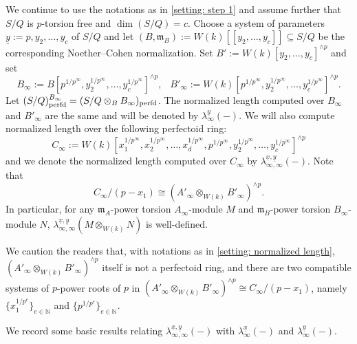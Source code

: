 \documentclass[12pt]{amsart}
\numberwithin{equation}{theorem}
\numberwithin{equation}{theorem}
\renewcommand{\m}{\mathfrak{m}}
\newcommand{\perfd}{\textnormal{perfd}}
\begin{document}
\begin{setting}
\label{setting: normalized length}
We continue to use the notations as in \autoref{setting: step 1} and  assume further that $S/Q$ is $p$-torsion free and $\dim(S/Q)=c$. Choose a system of parameters $\underline{y}:= p, y_2,\dots,y_c$ of $S/Q$ and let $(B,\m_B):=W(k)[[y_2,\dots,y_c]]\subseteq S/Q$ be the corresponding Noether--Cohen normalization. Set $B':=W(k)[y_2,\dots,y_c]^{\wedge p}$ and set
$$B_\infty:= B[p^{1/p^\infty}, y_2^{1/p^\infty},\dots,y_c^{1/p^\infty}]^{\wedge p}, \,\ \,\  B'_\infty:= W(k)[p^{1/p^\infty}, y_2^{1/p^\infty},\dots,y_c^{1/p^\infty}]^{\wedge p}.$$ 
Let $(S/Q)^{B_\infty}_\perfd = (S/Q \otimes_BB_\infty)_\perfd$. 
The normalized length computed over $B_\infty$ and $B'_\infty$ are the same and will be denoted by $\lambda_\infty^{\underline{y}}(-)$. 
We will also compute normalized length over the following perfectoid ring:
$$C_\infty := W(k)[x_1^{1/p^\infty},x_2^{1/p^\infty}, \dots,x_d^{1/p^\infty}, p^{1/p^\infty}, y_2^{1/p^\infty},\dots,y_c^{1/p^\infty}]^{\wedge p}$$
and we denote the normalized length computed over $C_\infty$ by $\lambda_{\infty,\infty}^{\underline{x},\underline{y}}(-)$. Note that
$$C_\infty/(p-x_1) \cong (A'_\infty \otimes_{W(k)} B'_\infty)^{\wedge p}.$$
In particular, for any $\m_A$-power torsion $A_\infty$-module $M$ and $\m_B$-power torsion $B_\infty$-module $N$, $\lambda_{\infty,\infty}^{\underline{x},\underline{y}}(M \otimes_{W(k)} N)$ is well-defined. 
\end{setting}

\begin{remark}
We caution the readers that, with notations as in \autoref{setting: normalized length}, $(A'_\infty \otimes_{W(k)} B'_\infty)^{\wedge p}$ itself is not a perfectoid ring, and there are two compatible systems of $p$-power roots of $p$ in $(A'_\infty \otimes_{W(k)} B'_\infty)^{\wedge p}\cong C_\infty/(p-x_1)$, namely $\{x_1^{1/p^e}\}_{e\in\mathbb
N}$ and $\{p^{1/p^e}\}_{e\in\mathbb N}$. 
\end{remark}

We record some basic results relating $\lambda_{\infty,\infty}^{\underline{x},\underline{y}}(-)$ with $\lambda_\infty^{\underline{x}}(-)$ and $\lambda_\infty^{\underline{y}}(-)$.
\end{document}
